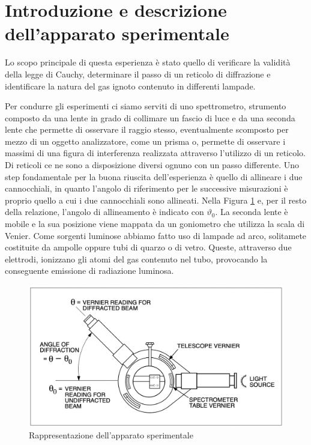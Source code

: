 \section{Introduzione e descrizione dell'apparato sperimentale}
Lo scopo principale di questa esperienza è stato quello di verificare la validità della legge di Cauchy, determinare il passo di un reticolo di diffrazione e identificare la natura del gas ignoto contenuto in differenti lampade.

Per condurre gli esperimenti ci siamo serviti di uno spettrometro, strumento composto da una lente in grado di collimare un fascio di luce e da una seconda lente che permette di osservare il raggio stesso, eventualmente scomposto per mezzo di un oggetto analizzatore, come un prisma o, permette di osservare i massimi di una figura di interferenza realizzata attraverso l'utilizzo di un reticolo. Di reticoli ce ne sono a disposizione diversi ognuno con un passo differente.  Uno step fondamentale per la buona riuscita dell'esperienza è quello di allineare i due cannocchiali, in quanto l'angolo di riferimento per le successive misurazioni è proprio quello a cui i due cannocchiali sono allineati. Nella Figura \ref{Fig.1} e, per il resto della relazione, l'angolo di allineamento è indicato con $\vartheta_0$.
La seconda lente è mobile e la sua posizione viene mappata da un goniometro che utilizza la scala di Venier.
Come sorgenti luminose abbiamo fatto uso di lampade ad arco, solitamete costituite da ampolle oppure tubi di quarzo o di vetro. Queste, attraverso due elettrodi, ionizzano gli atomi del gas contenuto nel tubo, provocando la conseguente emissione di radiazione luminosa.

\begin{figure}[h!]
    \centering
    \includegraphics[scale=.5]{Immagini/spettrometro 1.png}
    \caption{Rappresentazione dell'apparato sperimentale}
    \label{Fig.1}
\end{figure}

